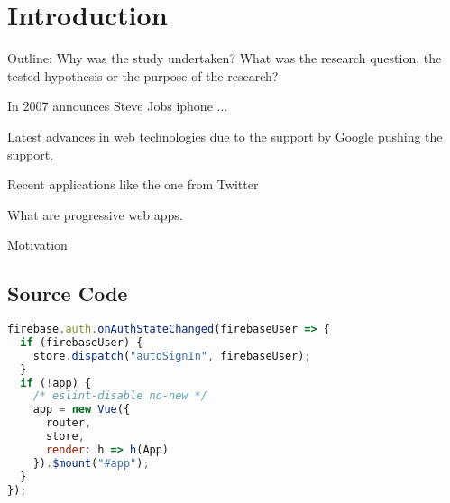 \chapter{Introduction}

Outline: Why was the study undertaken?
What was the research question, the tested hypothesis or the purpose of the research?

In 2007 announces Steve Jobs iphone ...

Latest advances in web technologies due to the support by Google pushing the support.

Recent applications like the one from Twitter

What are progressive web apps.

Motivation
\cite{liebelProgressiveWebApps2019}

\section{Source Code}

\begin{lstlisting}[language=JavaScript, caption=Firebase Auth initiation, label=lst:firebase-auth]
firebase.auth.onAuthStateChanged(firebaseUser => {
  if (firebaseUser) {
    store.dispatch("autoSignIn", firebaseUser);
  }
  if (!app) {
    /* eslint-disable no-new */
    app = new Vue({
      router,
      store,
      render: h => h(App)
    }).$mount("#app");
  }
});
\end{lstlisting}
